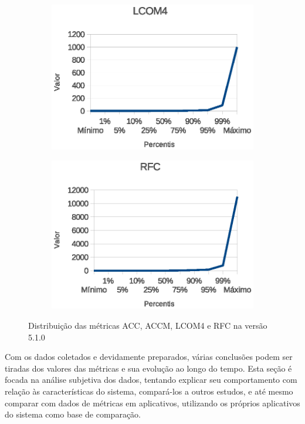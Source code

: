 \begin{figure}
\begin{subfigure}[b]{0.475\textwidth}
            \includegraphics[width=\textwidth]{figuras/dist/lcom4.eps}
        \end{subfigure}
        \quad
        \begin{subfigure}[b]{0.475\textwidth}   
            \centering 
            \includegraphics[width=\textwidth]{figuras/dist/rfc.eps}
        \end{subfigure}
        \caption[]
        {\small Distribuição das métricas ACC, ACCM, LCOM4 e RFC na versão 5.1.0} 
 \label{fig:android510dist}
    \end{figure}


Com os dados coletados e devidamente preparados, várias conclusões podem ser tiradas dos valores das métricas e sua evolução ao longo do tempo. Esta seção é focada na análise subjetiva dos dados, tentando explicar seu comportamento com relação às características do sistema, compará-los a outros estudos, e até mesmo comparar com dados de métricas em aplicativos, utilizando os próprios aplicativos do sistema como base de comparação.

